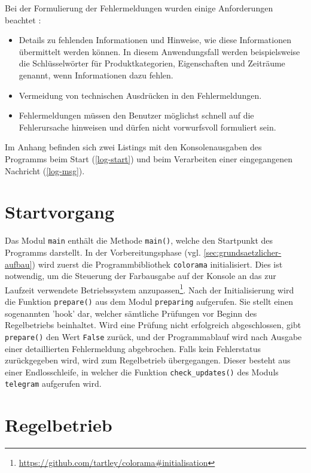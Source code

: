 Bei der Formulierung der Fehlermeldungen wurden einige Anforderungen beachtet \cite[S. 495]{ux}: 

\begin{itemize}
\item Details zu fehlenden Informationen und Hinweise, wie diese Informationen übermittelt werden können. In diesem Anwendungsfall werden beispielsweise die Schlüsselwörter für Produktkategorien, Eigenschaften und Zeiträume genannt, wenn Informationen dazu fehlen.
\item Vermeidung von technischen Ausdrücken in den Fehlermeldungen.
\item Fehlermeldungen müssen den Benutzer möglichst schnell auf die Fehlerursache hinweisen und dürfen nicht vorwurfsvoll formuliert sein.
\end{itemize}

Im Anhang befinden sich zwei Listings mit den Konsolenausgaben des Programms beim Start (\autoref{log-start}) und beim Verarbeiten einer eingegangenen Nachricht (\autoref{log-msg}).

\section{Startvorgang}
\label{sec:startvorgang}

Das Modul \lstinline{main} enthält die Methode \lstinline{main()}, welche den Startpunkt des Programms darstellt. In der Vorbereitungsphase (vgl. \autoref{sec:grundsaetzlicher-aufbau}) wird zuerst die Programmbibliothek \lstinline{colorama} initialisiert. Dies ist notwendig, um die Steuerung der Farbausgabe auf der Konsole an das zur Laufzeit verwendete Betriebssystem anzupassen\footnote{\url{https://github.com/tartley/colorama\#initialisation}}. Nach der Initialisierung wird die Funktion \lstinline{prepare()} aus dem Modul \lstinline{preparing} aufgerufen. Sie stellt einen sogenannten 'hook' dar, welcher sämtliche Prüfungen vor Beginn des Regelbetriebs beinhaltet. Wird eine Prüfung nicht erfolgreich abgeschlossen, gibt \lstinline{prepare()} den Wert \lstinline{False} zurück, und der Programmablauf wird nach Ausgabe einer detaillierten Fehlermeldung abgebrochen. Falls kein Fehlerstatus zurückgegeben wird, wird zum Regelbetrieb übergegangen. Dieser besteht aus einer Endlosschleife, in welcher die Funktion \lstinline{check_updates()} des Moduls \lstinline{telegram} aufgerufen wird.

\section{Regelbetrieb}

